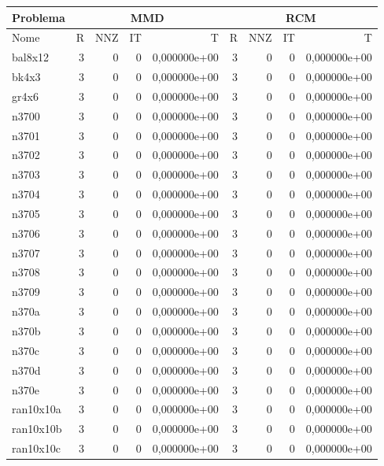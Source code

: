 \begin{tabular}{|l|r|r|r|r|r|r|r|r|}
\hline
\multicolumn{1}{|c|}{Problema} & \multicolumn{4}{|c|}{MMD} &         \multicolumn{4}{|c|}{RCM} \\ \hline
Nome & R & NNZ & IT & T & R & NNZ & IT & T \\ \hline
bal8x12 & 3 & 0 & 0 & 0,000000e+00 & 3 & 0 & 0 & 0,000000e+00 \\ \hline
bk4x3 & 3 & 0 & 0 & 0,000000e+00 & 3 & 0 & 0 & 0,000000e+00 \\ \hline
gr4x6 & 3 & 0 & 0 & 0,000000e+00 & 3 & 0 & 0 & 0,000000e+00 \\ \hline
n3700 & 3 & 0 & 0 & 0,000000e+00 & 3 & 0 & 0 & 0,000000e+00 \\ \hline
n3701 & 3 & 0 & 0 & 0,000000e+00 & 3 & 0 & 0 & 0,000000e+00 \\ \hline
n3702 & 3 & 0 & 0 & 0,000000e+00 & 3 & 0 & 0 & 0,000000e+00 \\ \hline
n3703 & 3 & 0 & 0 & 0,000000e+00 & 3 & 0 & 0 & 0,000000e+00 \\ \hline
n3704 & 3 & 0 & 0 & 0,000000e+00 & 3 & 0 & 0 & 0,000000e+00 \\ \hline
n3705 & 3 & 0 & 0 & 0,000000e+00 & 3 & 0 & 0 & 0,000000e+00 \\ \hline
n3706 & 3 & 0 & 0 & 0,000000e+00 & 3 & 0 & 0 & 0,000000e+00 \\ \hline
n3707 & 3 & 0 & 0 & 0,000000e+00 & 3 & 0 & 0 & 0,000000e+00 \\ \hline
n3708 & 3 & 0 & 0 & 0,000000e+00 & 3 & 0 & 0 & 0,000000e+00 \\ \hline
n3709 & 3 & 0 & 0 & 0,000000e+00 & 3 & 0 & 0 & 0,000000e+00 \\ \hline
n370a & 3 & 0 & 0 & 0,000000e+00 & 3 & 0 & 0 & 0,000000e+00 \\ \hline
n370b & 3 & 0 & 0 & 0,000000e+00 & 3 & 0 & 0 & 0,000000e+00 \\ \hline
n370c & 3 & 0 & 0 & 0,000000e+00 & 3 & 0 & 0 & 0,000000e+00 \\ \hline
n370d & 3 & 0 & 0 & 0,000000e+00 & 3 & 0 & 0 & 0,000000e+00 \\ \hline
n370e & 3 & 0 & 0 & 0,000000e+00 & 3 & 0 & 0 & 0,000000e+00 \\ \hline
ran10x10a & 3 & 0 & 0 & 0,000000e+00 & 3 & 0 & 0 & 0,000000e+00 \\ \hline
ran10x10b & 3 & 0 & 0 & 0,000000e+00 & 3 & 0 & 0 & 0,000000e+00 \\ \hline
ran10x10c & 3 & 0 & 0 & 0,000000e+00 & 3 & 0 & 0 & 0,000000e+00 \\ \hline

\end{tabular}
